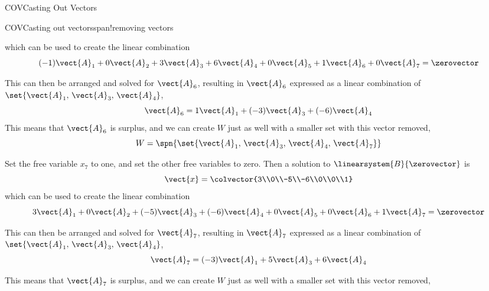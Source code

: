 \begin{subsect}{COV}{Casting Out Vectors}
\begin{example}{COV}{Casting out vectors}{span!removing vectors}
\begin{para}
\begin{equation*}
\end{equation*}
%
which can be used to create the linear combination
%
\begin{equation*}
(-1)\vect{A}_1+
0\vect{A}_2+
3\vect{A}_3+
6\vect{A}_4+
0\vect{A}_5+
1\vect{A}_6+
0\vect{A}_7
=\zerovector
\end{equation*}
\end{para}
%
\begin{para}This can then be arranged and solved for $\vect{A}_6$, resulting in $\vect{A}_6$ expressed as a linear combination of $\set{\vect{A}_1,\,\vect{A}_3,\,\vect{A}_4}$,
%
\begin{equation*}
\vect{A}_6=
1\vect{A}_1+
(-3)\vect{A}_3+
(-6)\vect{A}_4
\end{equation*}
%
This means that $\vect{A}_6$ is surplus, and we can create $W$ just as well with a smaller set with  this vector removed,
%
%
\begin{equation*}
W=\spn{\set{\vect{A}_1,\,\vect{A}_3,\,\vect{A}_4,\,\vect{A}_7}}
\end{equation*}\end{para}
%
\begin{para}Set the free variable $x_7$ to one, and set the other free variables to zero.  Then a solution to $\linearsystem{B}{\zerovector}$ is
%
\begin{equation*}
\vect{x}=\colvector{3\\0\\-5\\-6\\0\\0\\1}
\end{equation*}
%
which can be used to create the linear combination
%
\begin{equation*}
3\vect{A}_1+
0\vect{A}_2+
(-5)\vect{A}_3+
(-6)\vect{A}_4+
0\vect{A}_5+
0\vect{A}_6+
1\vect{A}_7
=\zerovector
\end{equation*}
\end{para}
%
\begin{para}This can then be arranged and solved for $\vect{A}_7$, resulting in $\vect{A}_7$ expressed as a linear combination of $\set{\vect{A}_1,\,\vect{A}_3,\,\vect{A}_4}$,
%
\begin{equation*}
\vect{A}_7=
(-3)\vect{A}_1+
5\vect{A}_3+
6\vect{A}_4
\end{equation*}
\end{para}
%
\begin{para}This means that $\vect{A}_7$ is surplus, and we can create $W$ just as well with a smaller set with  this vector removed,

\end{para}
\end{example}
\end{subsect}
